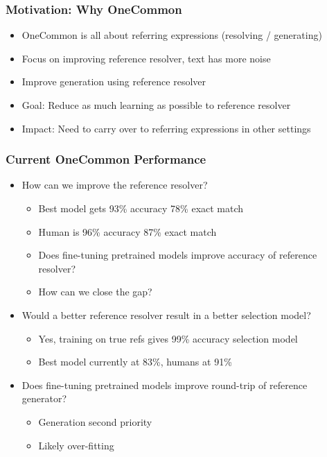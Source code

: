 \documentclass{beamer}
\begin{document}
\begin{frame}
\frametitle{Motivation: Why OneCommon}
\begin{itemize}
\item OneCommon is all about referring expressions (resolving / generating)
\item Focus on improving reference resolver, text has more noise
\item Improve generation using reference resolver
\item Goal: Reduce as much learning as possible to reference resolver
\item Impact: Need to carry over to referring expressions in other settings
\end{itemize}
\end{frame}

\begin{frame}
\frametitle{Current OneCommon Performance}
\begin{itemize}
\item How can we improve the reference resolver?
    \begin{itemize}
    \item Best model gets 93\% accuracy 78\% exact match
    \item Human is 96\% accuracy 87\% exact match
    \item Does fine-tuning pretrained models improve accuracy of reference resolver?
    \item How can we close the gap?
    \end{itemize}
\item Would a better reference resolver result in a better selection model?
    \begin{itemize}
    \item Yes, training on true refs gives 99\% accuracy selection model
    \item Best model currently at 83\%, humans at 91\%
    \end{itemize}
\item Does fine-tuning pretrained models improve round-trip of reference generator?
    \begin{itemize}
    \item Generation second priority
    \item Likely over-fitting
    \end{itemize}
\end{itemize}
\end{frame}
\end{document}
